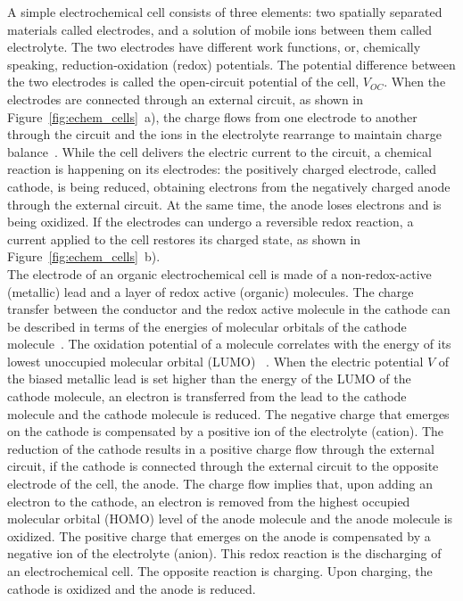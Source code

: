A simple electrochemical cell consists of three elements: two spatially separated materials called electrodes, and a solution of mobile ions between them called electrolyte. The two electrodes have different work functions, or, chemically speaking, reduction-oxidation (redox) potentials. The potential difference between the two electrodes is called the open-circuit potential of the cell, $V_{OC}$. When the electrodes are connected through an external circuit, as shown in Figure~\ref{fig:echem_cells}~a), the charge flows from one electrode to another through the circuit and the ions in the electrolyte rearrange to maintain charge balance~\cite{muench2016_chemrev}. While the cell delivers the electric current to the circuit, a chemical reaction is happening on its electrodes: the positively charged electrode, called cathode, is being reduced, obtaining electrons from the negatively charged anode through the external circuit. At the same time, the anode loses electrons and is being oxidized. If the electrodes can undergo a reversible redox reaction, a current applied to the cell restores its charged state, as shown in Figure~\ref{fig:echem_cells}~b).\\

The electrode of an organic electrochemical cell is made of a non-redox-active (metallic) lead and a layer of redox active (organic) molecules. The charge transfer between the conductor and the redox active molecule in the cathode can be described in terms of the energies of molecular orbitals of the cathode molecule~\cite{DOM,Wu_2023}. The oxidation potential of a molecule correlates with the energy of its lowest unoccupied molecular orbital (LUMO) ~\cite{Wu_2023}. When the electric potential $V$ of the biased metallic lead is set higher than the energy of the LUMO of the cathode molecule, an electron is transferred from the lead to the cathode molecule and the cathode molecule is reduced. The negative charge that emerges on the cathode is compensated by a positive ion of the electrolyte (cation). The reduction of the cathode results in a positive charge flow through the external circuit, if the cathode is connected through the external circuit to the opposite electrode of the cell, the anode. The charge flow implies that, upon adding an electron to the cathode, an electron is removed from the highest occupied molecular orbital (HOMO) level of the anode molecule and the anode molecule is oxidized. The positive charge that emerges on the anode is compensated by a negative ion of the electrolyte (anion). This redox reaction is the discharging of an electrochemical cell. The opposite reaction is charging. Upon charging, the cathode is oxidized and the anode is reduced.\\

